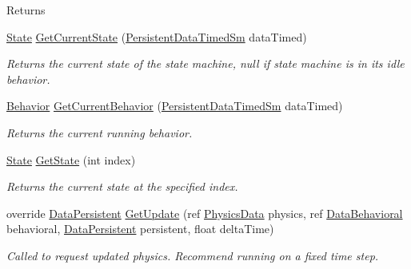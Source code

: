 \begin{DoxyCompactItemize}
\begin{DoxyCompactList}
\begin{DoxyReturn}{Returns}
\end{DoxyReturn}
 \end{DoxyCompactList}\item 
\hyperlink{class_skyrates_1_1_a_i_1_1_state_1_1_state}{State} \hyperlink{class_skyrates_1_1_a_i_1_1_state_1_1_state_machine_a7fa7e70a4b9a776f8a141e123d2ab3bd}{Get\-Current\-State} (\hyperlink{class_skyrates_1_1_a_i_1_1_state_1_1_state_machine_1_1_persistent_data_timed_sm}{Persistent\-Data\-Timed\-Sm} data\-Timed)
\begin{DoxyCompactList}\small\item\em Returns the current state of the state machine, null if state machine is in its idle behavior. \end{DoxyCompactList}\item 
\hyperlink{class_skyrates_1_1_a_i_1_1_behavior}{Behavior} \hyperlink{class_skyrates_1_1_a_i_1_1_state_1_1_state_machine_aded300b50db9634aeace185557767c51}{Get\-Current\-Behavior} (\hyperlink{class_skyrates_1_1_a_i_1_1_state_1_1_state_machine_1_1_persistent_data_timed_sm}{Persistent\-Data\-Timed\-Sm} data\-Timed)
\begin{DoxyCompactList}\small\item\em Returns the current running behavior. \end{DoxyCompactList}\item 
\hyperlink{class_skyrates_1_1_a_i_1_1_state_1_1_state}{State} \hyperlink{class_skyrates_1_1_a_i_1_1_state_1_1_state_machine_a78ec927dfaa5cc17fae35a86a96d50d9}{Get\-State} (int index)
\begin{DoxyCompactList}\small\item\em Returns the current state at the specified index. \end{DoxyCompactList}\item 
\hypertarget{class_skyrates_1_1_a_i_1_1_state_1_1_state_machine_ac840e5482c227e7f06367a377c83c209}{override \hyperlink{class_skyrates_1_1_a_i_1_1_behavior_1_1_data_persistent}{Data\-Persistent} \hyperlink{class_skyrates_1_1_a_i_1_1_state_1_1_state_machine_ac840e5482c227e7f06367a377c83c209}{Get\-Update} (ref \hyperlink{class_skyrates_1_1_physics_1_1_physics_data}{Physics\-Data} physics, ref \hyperlink{class_skyrates_1_1_a_i_1_1_behavior_1_1_data_behavioral}{Data\-Behavioral} behavioral, \hyperlink{class_skyrates_1_1_a_i_1_1_behavior_1_1_data_persistent}{Data\-Persistent} persistent, float delta\-Time)}\label{class_skyrates_1_1_a_i_1_1_state_1_1_state_machine_ac840e5482c227e7f06367a377c83c209}

\begin{DoxyCompactList}\small\item\em Called to request updated physics. Recommend running on a fixed time step. 



\end{DoxyCompactList}
\end{DoxyCompactItemize}
